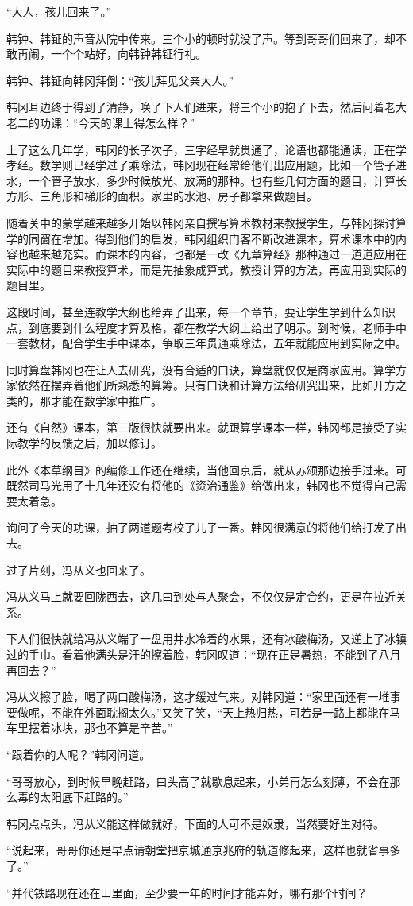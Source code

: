 “大人，孩儿回来了。”

韩钟、韩钲的声音从院中传来。三个小的顿时就没了声。等到哥哥们回来了，却不敢再闹，一个个站好，向韩钟韩钲行礼。

韩钟、韩钲向韩冈拜倒：“孩儿拜见父亲大人。”

韩冈耳边终于得到了清静，唤了下人们进来，将三个小的抱了下去，然后问着老大老二的功课：“今天的课上得怎么样？”

上了这么几年学，韩冈的长子次子，三字经早就贯通了，论语也都能通读，正在学孝经。数学则已经学过了乘除法，韩冈现在经常给他们出应用题，比如一个管子进水，一个管子放水，多少时候放光、放满的那种。也有些几何方面的题目，计算长方形、三角形和梯形的面积。家里的水池、房子都拿来做题目。

随着关中的蒙学越来越多开始以韩冈亲自撰写算术教材来教授学生，与韩冈探讨算学的同窗在增加。得到他们的启发，韩冈组织门客不断改进课本，算术课本中的内容也越来越充实。而课本的内容，也都是一改《九章算经》那种通过一道道应用在实际中的题目来教授算术，而是先抽象成算式，教授计算的方法，再应用到实际的题目里。

这段时间，甚至连教学大纲也给弄了出来，每一个章节，要让学生学到什么知识点，到底要到什么程度才算及格，都在教学大纲上给出了明示。到时候，老师手中一套教材，配合学生手中课本，争取三年贯通乘除法，五年就能应用到实际之中。

同时算盘韩冈也在让人去研究，没有合适的口诀，算盘就仅仅是商家应用。算学方家依然在摆弄着他们所熟悉的算筹。只有口诀和计算方法给研究出来，比如开方之类的，那才能在数学家中推广。

还有《自然》课本，第三版很快就要出来。就跟算学课本一样，韩冈都是接受了实际教学的反馈之后，加以修订。

此外《本草纲目》的编修工作还在继续，当他回京后，就从苏颂那边接手过来。可既然司马光用了十几年还没有将他的《资治通鉴》给做出来，韩冈也不觉得自己需要太着急。

询问了今天的功课，抽了两道题考校了儿子一番。韩冈很满意的将他们给打发了出去。

过了片刻，冯从义也回来了。

冯从义马上就要回陇西去，这几曰到处与人聚会，不仅仅是定合约，更是在拉近关系。

下人们很快就给冯从义端了一盘用井水冷着的水果，还有冰酸梅汤，又递上了冰镇过的手巾。看着他满头是汗的擦着脸，韩冈叹道：“现在正是暑热，不能到了八月再回去？”

冯从义擦了脸，喝了两口酸梅汤，这才缓过气来。对韩冈道：“家里面还有一堆事要做呢，不能在外面耽搁太久。”又笑了笑，“天上热归热，可若是一路上都能在马车里摆着冰块，那也不算是辛苦。”

“跟着你的人呢？”韩冈问道。

“哥哥放心，到时候早晚赶路，曰头高了就歇息起来，小弟再怎么刻薄，不会在那么毒的太阳底下赶路的。”

韩冈点点头，冯从义能这样做就好，下面的人可不是奴隶，当然要好生对待。

“说起来，哥哥你还是早点请朝堂把京城通京兆府的轨道修起来，这样也就省事多了。”

“并代铁路现在还在山里面，至少要一年的时间才能弄好，哪有那个时间？

